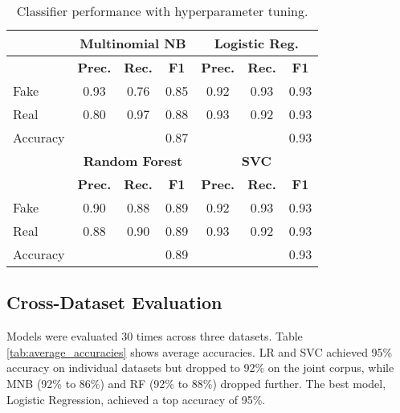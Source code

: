 \documentclass[conference]{IEEEtran}
\begin{document}
\begin{table}[!t]
\caption{Classifier performance with hyperparameter tuning.}
\label{tab:hyperparam_summary}
\begin{center}
\begin{tabular}{|l|ccc|ccc|}
\hline
& \multicolumn{3}{c|}{\textbf{Multinomial NB}} & \multicolumn{3}{c|}{\textbf{Logistic Reg.}} \\
\hline
& \textbf{Prec.} & \textbf{Rec.} & \textbf{F1} & \textbf{Prec.} & \textbf{Rec.} & \textbf{F1} \\
\hline
Fake & 0.93 & 0.76 & 0.85 & 0.92 & 0.93 & 0.93 \\
Real & 0.80 & 0.97 & 0.88 & 0.93 & 0.92 & 0.93 \\
Accuracy & & & 0.87 & & & 0.93 \\
\hline
& \multicolumn{3}{c|}{\textbf{Random Forest}} & \multicolumn{3}{c|}{\textbf{SVC}} \\
\hline
& \textbf{Prec.} & \textbf{Rec.} & \textbf{F1} & \textbf{Prec.} & \textbf{Rec.} & \textbf{F1} \\
\hline
Fake & 0.90 & 0.88 & 0.89 & 0.92 & 0.93 & 0.93 \\
Real & 0.88 & 0.90 & 0.89 & 0.93 & 0.92 & 0.93 \\
Accuracy & & & 0.89 & & & 0.93 \\
\hline
\end{tabular}
\end{center}
\end{table}

\subsection{Cross-Dataset Evaluation}
Models were evaluated 30 times across three datasets. Table \ref{tab:average_accuracies} shows average accuracies. LR and SVC achieved 95\% accuracy on individual datasets but dropped to 92\% on the joint corpus, while MNB (92\% to 86\%) and RF (92\% to 88\%) dropped further. The best model, Logistic Regression, achieved a top accuracy of 95\%.
\end{document}
